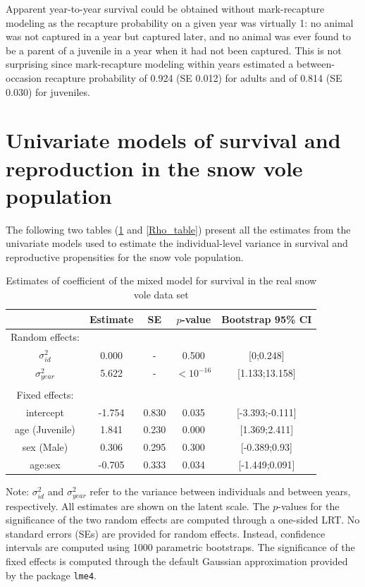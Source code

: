 Apparent year-to-year survival could be obtained without mark-recapture modeling as the recapture probability on a given year was virtually 1: no animal was not captured in a year but captured later, and no animal was ever found to be a parent of a juvenile in a year when it had not been captured. This is not surprising since mark-recapture modeling within years estimated a between-occasion recapture probability of 0.924 (SE 0.012) for adults and of 0.814 (SE 0.030) for juveniles.


\section{Univariate models of survival and reproduction in the snow vole population}\label{ap:Uni}

The following two tables (\ref{Phi_table} and \ref{Rho_table}) present all the estimates from the univariate models used to estimate the individual-level variance in survival and reproductive propensities for the snow vole population.
\begin{table}[H]
\begin{center}
\caption{Estimates of coefficient of the mixed model for survival in the real snow vole data set}\label{Phi_table}
\footnotesize
\begin{tabular}{ccccc}
  \toprule
 & Estimate & SE & $p$-value & Bootstrap 95\% CI  \\ 
  \midrule
	Random effects:\\
$\sigma_{id}^2$ & 0.000 & - & 0.500 & [0;0.248] \\ 
  $\sigma_{year}^2$ & 5.622 & - & $<10^{-16}$ & [1.133;13.158] \\ 
	\\
   Fixed effects:\\
intercept & -1.754 & 0.830 & 0.035 & [-3.393;-0.111] \\ 
  age (Juvenile) & 1.841 & 0.230 & 0.000 & [1.369;2.411] \\ 
  sex (Male) & 0.306 & 0.295 & 0.300 & [-0.389;0.93] \\ 
  age:sex & -0.705 & 0.333 & 0.034 & [-1.449;0.091] \\ 
   \bottomrule
\end{tabular}
\end{center}
{\scriptsize Note: $\sigma_{id}^2$ and $\sigma_{year}^2$ refer to the variance between individuals and between years, respectively. All estimates are shown on the latent scale. The $p$-values for the significance of the two random effects are computed through a one-sided LRT. No standard errors (SEs) are provided for random effects. Instead, confidence intervals are computed using 1000 parametric bootstraps. The significance of the fixed effects is computed through the default Gaussian approximation provided by the package \texttt{lme4}.}
\end{table}

